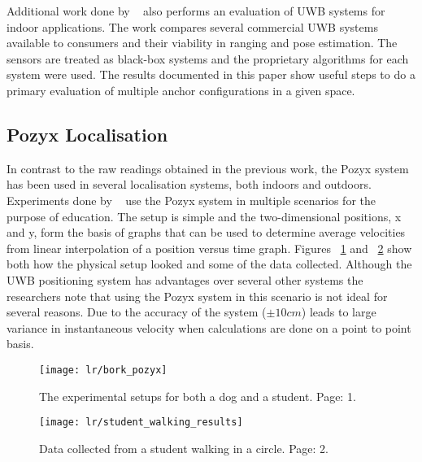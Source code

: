 Additional work done by ~\citet{di2019evaluation} also performs an evaluation of UWB systems for indoor applications.
The work compares several commercial UWB systems available to consumers and their viability in ranging and pose estimation.
The sensors are treated as black-box systems and the proprietary algorithms for each system were used.
The results documented in this paper show useful steps to do a primary evaluation of multiple anchor configurations in a given space.

\subsection{Pozyx Localisation}\label{subsec:pozyx-localisation}
In contrast to the raw readings obtained in the previous work, the Pozyx system has been used in several localisation systems, both indoors and outdoors.
Experiments done by ~\citet{destefano2019using} use the Pozyx system in multiple scenarios for the purpose of education.
The setup is simple and the two-dimensional positions, x and y, form the basis of  graphs that can be used to determine average velocities from linear interpolation of a position versus time graph.
Figures ~\ref{fig:bpozyx} and ~\ref{fig:stupozyx} show both how the physical setup looked and some of the data collected.
Although the UWB positioning system has advantages over several other systems the researchers note that using the Pozyx system in this scenario is not ideal for several reasons.
Due to the accuracy of the system ($\pm10cm$) leads to large variance in instantaneous velocity when calculations are done on a point to point basis.

\begin{figure}[h!]
    \centering
    \texttt{[image: lr/bork\_pozyx]}
    \caption{The experimental setups for both a dog and a student. \cite{destefano2019using} Page: 1.}
    \label{fig:bpozyx}
\end{figure}

\begin{figure}[h!]
    \centering
    \texttt{[image: lr/student\_walking\_results]}
    \caption{Data collected from a student walking in a circle. \cite{destefano2019using} Page: 2.}
    \label{fig:stupozyx}
\end{figure}

